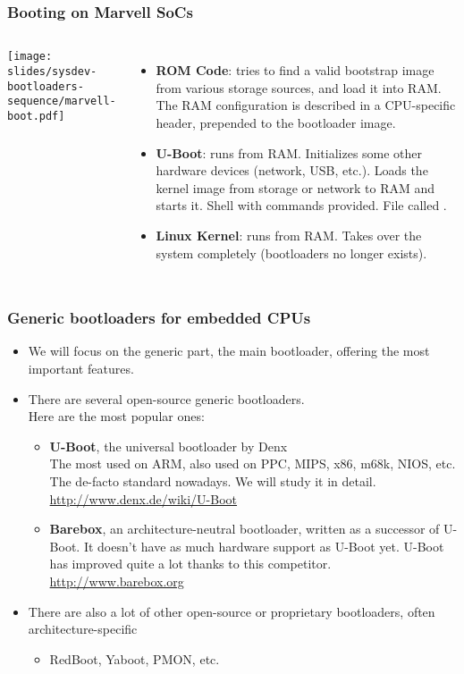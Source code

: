 

\begin{frame}
  \frametitle{Booting on Marvell SoCs}
  \begin{columns}
    \texttt{[image: slides/sysdev-bootloaders-sequence/marvell-boot.pdf]}
    \footnotesize
    \begin{itemize}
    \item {\bf ROM Code}: tries to find a valid bootstrap image from
      various storage sources, and load it into RAM. The RAM
      configuration is described in a CPU-specific header, prepended
      to the bootloader image.
    \item {\bf U-Boot}: runs from RAM. Initializes some other hardware
      devices (network, USB, etc.).  Loads the kernel image from
      storage or network to RAM and starts it. Shell with commands
      provided. File called .
    \item {\bf Linux Kernel}: runs from RAM. Takes over the system
      completely (bootloaders no longer exists).
    \end{itemize}
  \end{columns}
\end{frame}

\begin{frame}
  \frametitle{Generic bootloaders for embedded CPUs}
  \begin{itemize}
  \item We will focus on the generic part, the main bootloader, offering
    the most important features.
  \item There are several open-source generic bootloaders.\\
    Here are the most popular ones:
    \begin{itemize}
    \item {\bf U-Boot}, the universal bootloader by Denx\\
      The most used on ARM, also used on PPC, MIPS, x86, m68k, NIOS,
      etc. The de-facto standard nowadays. We will study it in detail.\\
      \url{http://www.denx.de/wiki/U-Boot}
    \item {\bf Barebox}, an architecture-neutral bootloader, written
      as a successor of U-Boot. It doesn't have as much hardware support
      as U-Boot yet. U-Boot has improved quite a lot thanks to this
      competitor.\\
      \url{http://www.barebox.org}
    \end{itemize}
  \item There are also a lot of other open-source or proprietary
    bootloaders, often architecture-specific
    \begin{itemize}
    \item RedBoot, Yaboot, PMON, etc.
    \end{itemize}
  \end{itemize}
\end{frame}
